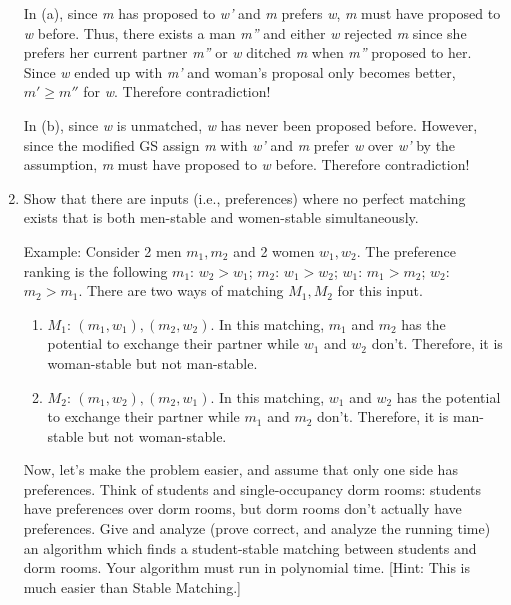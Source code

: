 \documentclass{homework}
\begin{document}
\begin{enumerate}
    In (a), since \textit{m} has proposed to \textit{w'} and \textit{m} prefers \textit{w}, \textit{m} must have proposed to \textit{w} before. Thus, there exists a man \textit{m''} and either \textit{w} rejected \textit{m} since she prefers her current partner \textit{m''} or \textit{w} ditched \textit{m} when \textit{m''} proposed to her. Since \textit{w} ended up with \textit{m'} and woman's proposal only becomes better, \textit{$m' \geq m''$} for \textit{w}. Therefore contradiction!
    
    In (b), since \textit{w} is unmatched, \textit{w} has never been proposed before. However, since the modified GS assign \textit{m} with \textit{w'} and \textit{m} prefer \textit{w} over \textit{w'} by the assumption, \textit{m} must have proposed to \textit{w} before. Therefore contradiction!

    \item 
    \question[1] Show that there are inputs (i.e., preferences) where no perfect matching exists that is both men-stable and women-stable simultaneously.

    Example: Consider 2 men \textit{$m_1, m_2$} and 2 women \textit{$w_1, w_2$}. The preference ranking is the following \textit{$m_1$}: \textit{$w_2 > w_1$}; \textit{$m_2$}: \textit{$w_1 > w_2$}; \textit{$w_1$}: \textit{$m_1 > m_2$}; \textit{$w_2$}: \textit{$m_2 > m_1$}. There are two ways of matching \textit{$M_1, M_2$} for this input. \begin{enumerate}
        \item \textit{$M_1$}: \textit{$(m_1, w_1), (m_2, w_2)$}. In this matching, \textit{$m_1$} and \textit{$m_2$} has the potential to exchange their partner while \textit{$w_1$} and \textit{$w_2$} don't. Therefore, it is woman-stable but not man-stable.
        \item \textit{$M_2$}: \textit{$(m_1, w_2), (m_2, w_1)$}. In this matching, \textit{$w_1$} and \textit{$w_2$} has the potential to exchange their partner while \textit{$m_1$} and \textit{$m_2$} don't. Therefore, it is man-stable but not woman-stable.
    \end{enumerate}

    \question[2] Now, let’s make the problem easier, and assume that only one side has preferences. Think of students and single-occupancy dorm rooms: students have preferences over dorm rooms, but dorm rooms don’t actually have preferences. Give and analyze (prove correct, and analyze the running time) an algorithm which finds a student-stable matching between students and dorm rooms. Your algorithm must run in polynomial time.
    [Hint: This is much easier than Stable Matching.]


\end{enumerate}
\end{document}
